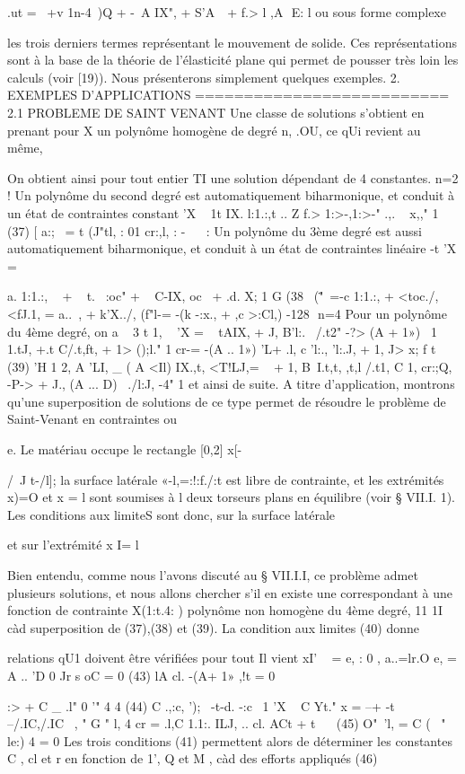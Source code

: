 { .ut = ~+v 1n-4~)Q + -~A IX", + S'A   + f.> l
,A 
E: l ou sous forme complexe 

les trois derniers termes représentant le mouvement de solide. Ces représen­tations sont à la base de la théorie de l'élasticité plane qui permet de pous­ser très loin les calculs (voir [19)). Nous présenterons simplement quelques exemples. 
2. EXEMPLES D'APPLICATIONS
========================== 
2.1 PROBLEME DE SAINT VENANT 
Une classe de solutions s'obtient en prenant pour X un polynôme homogène de degré n, .OU, ce qUi revient au même, 

On obtient ainsi pour tout entier TI une solution dépendant de 4 constantes. 
n=2 ! Un polynôme du second degré est automatiquement biharmonique, et con­duit à un état de contraintes constant 
'X ~ 1t IX. l:1.:,t .. Z f.> 1:>-,1:>-" .,. ~ x,," 1 
(37) 
[ 
a:;~ = t (J"tl, : 01 cr:,l, : -~ 
~ : Un polynôme du 3ème degré est aussi automatiquement biharmonique, et conduit à un état de contraintes linéaire 
-t
'X = { a. 1:1.:, ~ + ~ t. ~:oc" + ~ C-IX, oc~ + .d. X; 1 
G 
(38~ 
{ (\""\0\ =-c 1:1.:, + <toc./, <fJ.1, = a..~, + k'X../, (f"l-= -(k -:x., + ,c >:Cl,) 
-128 ­
n=4 Pour un polynôme du 4ème degré, on a 
~ 3 	t 1, ~ 
'X = 	~ tAIX, + J, B'l:.~ /.t2" -?> (A + 1») ~1 1.tJ, +.t C/.t,ft}, + 1> ();l." 1 cr-= -(A .. 1») 'L+ .l, c 'l:., 'l:.J, + 1, J> x;
f 	t 
(39) 'H 	1 
2, A 'LI, 	_ ( A <Il) IX.,t,
<T!LJ,= ~ + 1, B~I.t,t, ,t,l /.t1, C 1,
cr:;Q,~ -P-> + J., (A ... D)~ ./l:J, -4"
1 
et ainsi de suite. A titre d'application, montrons qu'une superposition de solutions de ce type permet de résoudre le problème de Saint-Venant en contraintes ou 

e. 
Le matériau occupe le rectangle [0,2] x[-{/~J t-/l]; la surface latérale «-l,=:!:f./:t est libre de contrainte, et les extrémités x)=O et x = l sont soumises à
l 
deux torseurs plans en équilibre (voir § VII.I. 1). Les conditions aux limi­teS sont donc, sur la surface latérale 

et sur l'extrémité x I= l 

Bien entendu, comme nous l'avons discuté au § VII.I.I, ce problème admet plusieurs solutions, et nous allons chercher s'il en existe une correspondant à une fonction de contrainte X(1:t.4: ) polynôme non homogène du 4ème degré,
11 1I
càd 	superposition de (37),(38) et (39). La condition aux limites (40) donne 

relations qU1 doivent être vérifiées pour tout Il vient
xI' 
~ 
= e, 	: 0 , a..=lr.O e, = A .. 'D 0 Jr s oC = 0 
(43) 
lA cl. -(A+ 1» ,!t = 0 {:> + C _ .l" 0
'" 
4 	4 
(44) C .,:c, ');~ -t-d. -:c~ 1 'X ~ C Yt."
x = --+ -t --/.IC,/.IC~
, " G " l, 4 
cr = .l,C 1.1:. ILJ, .. cl. ACt + t
~~ 
(45) 
O"~'l, = C ( ~" le:)
4 
= 0 
Les trois conditions (41) permettent alors de déterminer les constantes C , cl et r en fonction de 1', Q et M , càd des efforts appliqués 
(46) 

}}}}
